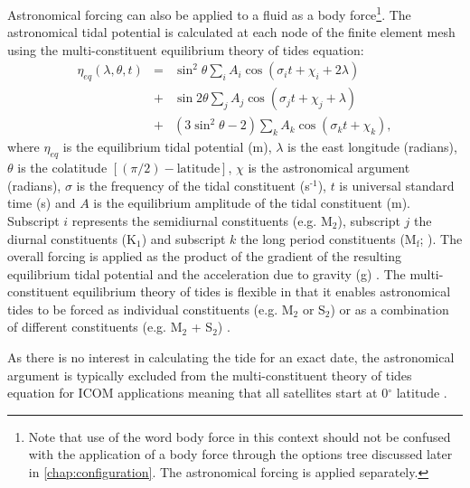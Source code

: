 Astronomical forcing can also be applied to a fluid as a body force\footnote{Note that use of the word body force in this context should not be confused with the application of a body force through the options tree discussed later in \ref{chap:configuration}. The astronomical forcing is applied separately.}. 
The astronomical tidal potential is calculated at each node of the finite element mesh using the 
multi-constituent equilibrium theory of tides equation:
  \begin{eqnarray}
\eta_{eq}\left(\lambda,\theta,t\right)&=&\sin^{2}\theta\sum_{i}A_{i}\cos\left(\sigma_{i}t+\chi_{i}+2\lambda\right)\nonumber\\
&+&\sin2\theta\sum_{j}A_{j}\cos\left(\sigma_{j}t+\chi_{j}+\lambda\right)\\
&+&\left(3\sin^{2}\theta-2\right)\sum_{k}A_{k}\cos\left(\sigma_{k}t+\chi_{k}\right)\nonumber,
\label{eq:multi-constituent-eq_theory}
  \end{eqnarray}
where $\eta_{eq}$ is the equilibrium tidal potential (m), $\lambda$ is the east longitude (radians), $\theta$ is the colatitude
$[(\pi/2)-{\text{latitude}}]$, $\chi$ is the astronomical argument (radians), $\sigma$
is the frequency of the tidal constituent (s$^{\text{-1}}$), $t$ is universal standard
time (s) and $A$ is the equilibrium amplitude of the tidal constituent (m). Subscript
$i$ represents the semidiurnal constituents (e.g. M$_{\text{2}}$), subscript $j$
the diurnal constituents (\eg K$_{\text{1}}$) and subscript $k$ the long period
constituents (\eg M$_{\text{f}}$; \citealp{Wells2008}).   
The overall forcing 
is applied as the product of the gradient of the resulting equilibrium tidal potential and the acceleration due 
to gravity (g) \citep{Mellor1996, Kantha2000, Wells2007}.
The multi-constituent equilibrium theory of tides is flexible in that it enables astronomical tides to be forced as 
individual constituents 
(e.g. M$_{2}$ or S$_{2}$) or as a combination of different constituents (e.g. M$_{2}$ + S$_{2}$) \citep{Wells2008}.

As there is no interest in calculating the tide for an exact date, the astronomical argument 
is typically excluded from the multi-constituent theory of tides equation for ICOM applications meaning that all satellites 
start at 0$^{\circ}$ latitude \citep{Wells2008}.

